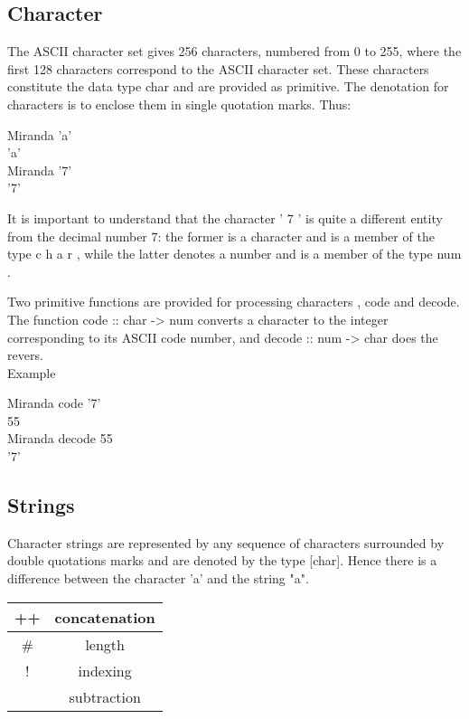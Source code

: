 \documentclass[11pt]{article}
\begin{document}
\subsection{Character}
The ASCII character set gives 256 characters, numbered from 0
to 255, where the first 128 characters correspond to the ASCII character set. These characters constitute the data type char and are provided as primitive. The denotation for
characters is to enclose them in single quotation marks. Thus:
\begin{tcolorbox}


Miranda 'a'\\
'a'\\
Miranda '7'\\
'7'
\end{tcolorbox}

It is important to understand that the character ' 7 ' is quite a different entity
from the decimal number 7: the former is a character and is a member of
the type c h a r , while the latter denotes a number and is a member of the
type num .

Two primitive functions are provided for processing characters , code and
decode. The function code :: char -> num converts a character to the integer
corresponding to its ASCII code number, and decode :: num -> char does
the revers.\\
Example

\begin{tcolorbox}
Miranda code '7'\\
55\\
Miranda decode 55\\
'7'

\end{tcolorbox}


\subsection{Strings}
Character strings are represented by any sequence of characters surrounded by
double quotations marks and are denoted by the type [char]. Hence there is a
difference between the character ’a’ and the string "a". 
\begin{center}

\begin{tabular}{ |c|c| } 
 \hline
 ++ & concatenation  \\ 
 \hline
 \# & length  \\ 
 \hline
 ! & indexing  \\
 \hline
 \-{} & subtraction \\
\hline
\end{tabular}
\label{Tab:1}
\end{center}
\end{document}
